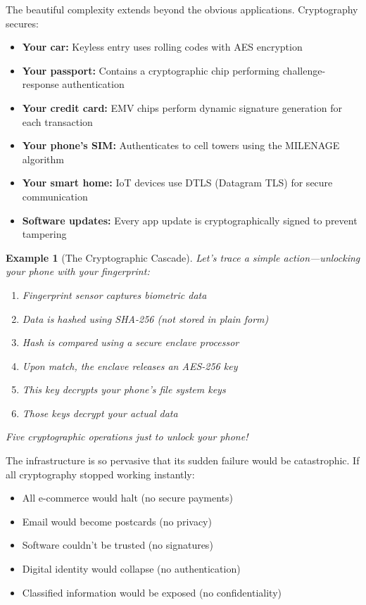 \documentclass[11pt,a4paper]{article}
\newtheorem{example}{Example}
\begin{document}
The beautiful complexity extends beyond the obvious applications. Cryptography secures:
\begin{itemize}
    \item \textbf{Your car:} Keyless entry uses rolling codes with AES encryption
    \item \textbf{Your passport:} Contains a cryptographic chip performing challenge-response authentication
    \item \textbf{Your credit card:} EMV chips perform dynamic signature generation for each transaction
    \item \textbf{Your phone's SIM:} Authenticates to cell towers using the MILENAGE algorithm
    \item \textbf{Your smart home:} IoT devices use DTLS (Datagram TLS) for secure communication
    \item \textbf{Software updates:} Every app update is cryptographically signed to prevent tampering
\end{itemize}

\begin{example}[The Cryptographic Cascade]
Let's trace a simple action---unlocking your phone with your fingerprint:
\begin{enumerate}
    \item Fingerprint sensor captures biometric data
    \item Data is hashed using SHA-256 (not stored in plain form)
    \item Hash is compared using a secure enclave processor
    \item Upon match, the enclave releases an AES-256 key
    \item This key decrypts your phone's file system keys
    \item Those keys decrypt your actual data
\end{enumerate}
Five cryptographic operations just to unlock your phone!
\end{example}

The infrastructure is so pervasive that its sudden failure would be catastrophic. If all cryptography stopped working instantly:
\begin{itemize}
    \item All e-commerce would halt (no secure payments)
    \item Email would become postcards (no privacy)
    \item Software couldn't be trusted (no signatures)
    \item Digital identity would collapse (no authentication)
    \item Classified information would be exposed (no confidentiality)
\end{itemize}
\end{document}
